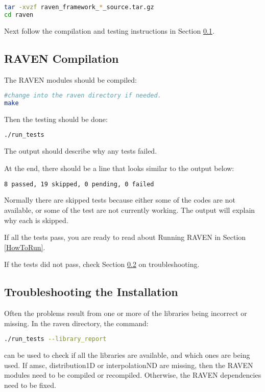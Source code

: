 \begin{lstlisting}[language=bash]
tar -xvzf raven_framework_*_source.tar.gz
cd raven
\end{lstlisting}

Next follow the compilation and testing instructions in Section
\ref{raven_compilation}.

\subsection{RAVEN Compilation}
\label{raven_compilation}

The RAVEN modules should be compiled:

\begin{lstlisting}[language=bash]
#change into the raven directory if needed.
make
\end{lstlisting}

Then the testing should be done:

\begin{lstlisting}[language=bash]
./run_tests
\end{lstlisting}

The output should describe why any tests failed.

At the end, there should be a line that looks similar to the output below:
\begin{lstlisting}[language=bash]
8 passed, 19 skipped, 0 pending, 0 failed
\end{lstlisting}

Normally there are skipped tests because either some of the codes are
not available, or some of the test are not currently working.  The
output will explain why each is skipped.

If all the tests pass, you are ready to read about Running RAVEN in
Section \ref{HowToRun}.

If the tests did not pass, check Section
\ref{troubleshooting_installation} on troubleshooting.

\subsection{Troubleshooting the Installation}
\label{troubleshooting_installation}

Often the problems result from one or more of the libraries being
incorrect or missing.  In the raven directory, the command:

\begin{lstlisting}[language=bash]
./run_tests --library_report
\end{lstlisting}
can be used to check if all the libraries are available, and which
ones are being used.  If amsc, distribution1D or interpolationND are
missing, then the RAVEN modules need to be compiled or recompiled.
Otherwise, the RAVEN dependencies need to be fixed.

